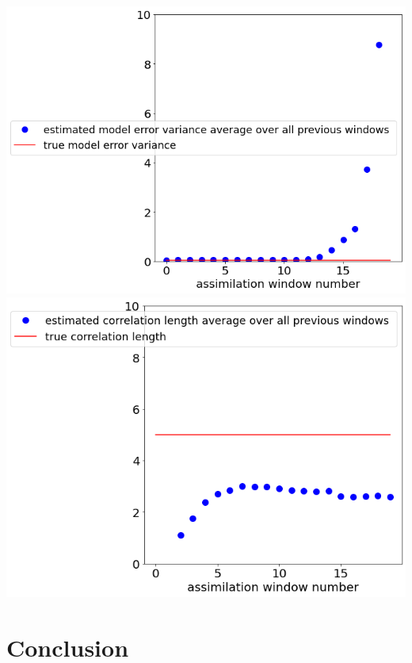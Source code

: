\documentclass[a4paper,10pt]{article}
\numberwithin{equation}{section}
\begin{document}
\includegraphics[scale=0.4]{Ex6meanvar}\hspace{-3cm}
\includegraphics[scale=0.4]{Ex6meanlen}

\section{Conclusion}
\newpage
\end{document}
